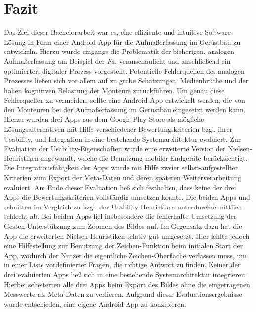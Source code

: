 \chapter{Fazit}
Das Ziel dieser Bachelorarbeit war es, eine effiziente und intuitive Software-Lösung in Form einer Android-App für die Aufmaßerfassung im Gerüstbau zu entwickeln.
Hierzu wurde eingangs die Problematik der bisherigen, analogen Aufmaßerfassung am Beispiel der \emph{Fa.} \vr{} veranschaulicht und anschließend ein optimierter, digitaler Prozess vorgestellt.
Potentielle Fehlerquellen des analogen Prozesses ließen sich vor allem auf zu grobe Schätzungen, Medienbrüche und der hohen kognitiven Belastung der Monteure zurückführen.
Um genau diese Fehlerquellen zu vermeiden, sollte eine Android-App entwickelt werden, die von den Monteuren bei der Aufmaßerfassung im Gerüstbau eingesetzt werden kann. \\

Hierzu wurden drei Apps aus dem Google-Play Store als mögliche Lösungsalternativen mit Hilfe verschiedener Bewertungskriterien bzgl. ihrer Usability, und Integration in eine bestehende Systemarchitektur evaluiert.
Zur Evaluation der Usability-Eigenschaften wurde eine erweiterte Version der Nielsen-Heuristiken angewandt, welche die Benutzung mobiler Endgeräte berücksichtigt.
Die Integrationsfähigkeit der Apps wurde mit Hilfe zweier selbst-aufgestellter Kriterien zum Export der Meta-Daten und deren späteren Weiterverarbeitung evaluiert.
Am Ende dieser Evaluation ließ sich festhalten, dass keine der drei Apps die Bewertungskriterien vollständig umsetzen konnte.
Die beiden Apps \mm{} und \pm{} schnitten im Vergleich zu \im{} bzgl. der Usability-Heuristiken unterdurchschnittlich schlecht ab.
Bei beiden Apps fiel insbesondere die fehlerhafte Umsetzung der Gesten-Unterstützung zum Zoomen des Bildes auf.
Im Gegensatz dazu hat die App \im{} die erweiterten Nielsen-Heuristiken relativ gut umgesetzt.
Hier fehlte jedoch eine Hilfestellung zur Benutzung der Zeichen-Funktion beim initialen Start der App, wodurch der Nutzer die eigentliche Zeichen-Oberfläche verlassen muss, um in einer Liste vordefinierter Fragen, die richtige Antwort zu finden.
Keiner der drei evaluierten Apps ließ sich in eine bestehende Systemarchitektur integrieren.
Hierbei scheiterten alle drei Apps beim Export des Bildes ohne die eingetragenen Messwerte als Meta-Daten zu verlieren.
Aufgrund dieser Evaluationsergebnisse wurde entschieden, eine eigene Android-App zu konzipieren. \\

